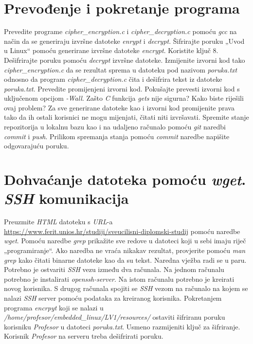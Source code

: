 \documentclass[11pt]{article}
\begin{document}
 \section{Prevođenje i pokretanje programa}
 Prevedite programe \textit{cipher\_encryption.c} i
 \textit{cipher\_decryption.c} pomoću \textit{gcc} na način da se generiraju
 izvršne datoteke \textit{enrypt} i \textit{decrypt}. Šifrirajte poruku
 „Uvod u Linux“ pomoću generirane izvršne datoteke \textit{encrypt}. Koristite
 ključ 8. Dešifrirajte poruku pomoću \textit{decrypt} izvršne datoteke.
 Izmijenite izvorni kod tako \textit{cipher\_encryption.c} da se rezultat
 sprema u datoteku pod nazivom \textit{poruka.txt} odnosno da program
 \textit{cipher\_decryption.c} čita i dešifrira tekst iz datoteke
 \textit{poruka.txt}. Prevedite promijenjeni izvorni kod.
\newline
\newline
Pokušajte prevesti izvorni kod s uključenom opcijom \textit{-Wall}. Zašto
 \textit{C} funkcija \textit{gets} nije sigurna? Kako biste riješili ovaj
 problem?
\newline
\newline
Za sve generirane datoteke kao i izvorni kod promijenite prava tako da ih
 ostali korisnici ne mogu mijenjati, čitati niti izvršavati.
\newline
\newline
Spremite stanje repozitorija u lokalnu bazu kao i na udaljeno računalo pomoću
 \textit{git} naredbi \textit{commit} i \textit{push}. Prilikom spremanja
 stanja pomoću \textit{commit} naredbe napišite odgovarajuću poruku.

 \section{Dohvaćanje datoteka pomoću \textit{wget}. \textit{SSH} komunikacija}
Preuzmite \textit{HTML} datoteku s \textit{URL}-a \\
\url{https://www.ferit.unios.hr/studiji/sveucilisni-diplomski-studij} pomoću
 naredbe \textit{wget}. Pomoću naredbe \textit{grep} prikažite sve redove u
 datoteci koji u sebi imaju riječ „programiranje“. Ako naredba ne vraća nikakav
 rezultat, provjerite pomoću \textit{man grep} kako čitati binarne datoteke kao
 da su tekst.
\newline
\newline
Naredna vježba radi se u paru. Potrebno je ostvariti \textit{SSH} vezu između
 dva računala. Na jednom računalu potrebno je instalirati
 \textit{openssh-server}. Na istom računalu potrebno je kreirati novog
 korisnika. S drugog računala spojiti se \textit{SSH} vezom na računalo na
 kojem se nalazi \textit{SSH} server pomoću podataka za kreiranog korisnika.
 Pokretanjem programa \textit{encrpyt} koji se nalazi u
 \textit{/home/profesor/embedded\_linux/LV1/resources/} ostaviti šifriranu poruku
 korisniku \textit{Profesor} u datoteci \textit{poruka.txt}. Usmeno razmijeniti
 ključ za šifriranje. Korisnik \textit{Profesor} na serveru treba dešifrirati
 poruku.
\end{document}
